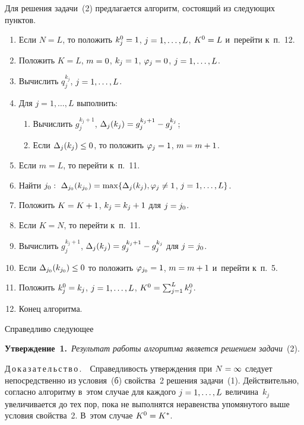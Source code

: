 \begin{multicols}{2}
  Для решения задачи~(2) предлагается алгоритм, состоящий из следующих 
пунктов.
  \begin{enumerate}[1.]
\item Если $N=L$, то положить $k_j^0\hm= 1$, $j\hm=1,\ldots, L$, 
$K^0\hm=L$ и~перейти к~п.~12. 
\item Положить $K=L$, $m\hm=0$, $k_j\hm=1$, $\varphi_j\hm=0$, 
$j\hm=1,\ldots ,L$.
\item Вычислить $q_j^{k_j}$, $j\hm=1,\ldots ,L$.
\item Для $j=1,\ldots, L$ выполнить:
\begin{enumerate}[1.{1}]
\item Вычислить $g_j^{k_j+1}$, $\Delta_j(k_j)\hm= g_j^{k_j+1}\hm- 
g_j^{k_j}$;
\item Если $\Delta_j(k_j)\hm\leq 0$, то положить $\varphi_j\hm=1$, 
$m\hm= m\hm+1$. 
\end{enumerate}
\item Если $m=L$, то перейти к~п.~11.
\item Найти $j_0:\ \Delta_{j_0}(k_{j_0})\hm= \max \{ \Delta_j(k_j), 
\varphi_j\not=1$, $j\hm=1,\ldots ,L\}$.
\item Положить $K\hm=K\hm+1$, $k_j\hm= k_j\hm+1$ для $j\hm=j_0$.
\item Если  $K=N$, то перейти к~п.~11.
\item Вычислить $g_j^{k_j+1}$, $\Delta_j(k_j)\hm= g_j^{k_j+1}\hm- 
g_j^{k_j}$ для $j\hm=j_0$. 
\item Если $\Delta_{j_0}(k_{j_0})\hm\leq 0$ то положить 
$\varphi_{j_0}\hm=1$, $m\hm= m\hm+1$ и~перейти к~п.~5. 
\item Положить $k_j^0\hm=k_j$, $j\hm=1,\ldots ,L$, $K^0\hm= 
\sum\nolimits^L_{j=1} k_j^0$.
\item Конец алгоритма.
\end{enumerate}
  
  Справедливо следующее 
  
  \smallskip
  
  \noindent
  \textbf{Утверждение~1.}\ \textit{Результат работы алгоритма является 
решением задачи}~(2).
  
  \smallskip
  
  \noindent
  Д\,о\,к\,а\,з\,а\,т\,е\,л\,ь\,с\,т\,в\,о\,.\ \
  Справедливость утверждения при $N\hm=\infty$ следует непосредственно из 
условия~(б) свойства~2 решения задачи~(1). Действительно, согласно алгоритму 
в~этом случае для каждого $j\hm=1,\ldots ,L$ величина~$k_j$ увеличивается до 
тех пор, пока не выполнятся неравенства упомянутого выше условия 
свойства~2. В~этом случае $K^0\hm=K^*$.
  

\end{multicols}
